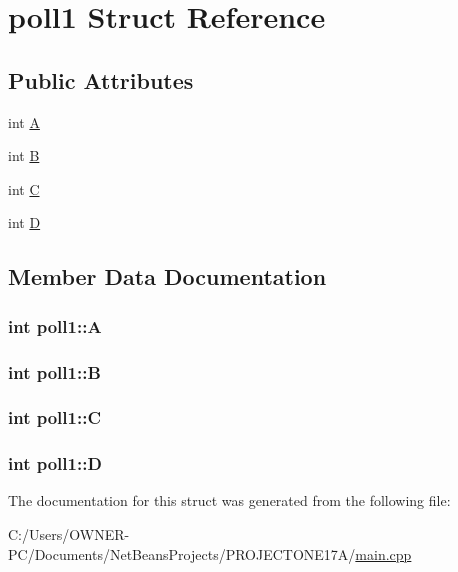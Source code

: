 \hypertarget{structpoll1}{\section{poll1 Struct Reference}
\label{structpoll1}
}
\subsection*{Public Attributes}
\begin{DoxyCompactItemize}
\item 
int \hyperlink{structpoll1_aa4038b3b8831be84ec7977d89d7958d0}{A}
\item 
int \hyperlink{structpoll1_a67e96a6486339656804cd7580d1a1c17}{B}
\item 
int \hyperlink{structpoll1_a698ff5d2ee805279fa834ae8e21b6c28}{C}
\item 
int \hyperlink{structpoll1_adddf16b74325e602d80db6681b9ee80a}{D}
\end{DoxyCompactItemize}


\subsection{Member Data Documentation}
\hypertarget{structpoll1_aa4038b3b8831be84ec7977d89d7958d0}{
\subsubsection[{A}]{\setlength{\rightskip}{0pt plus 5cm}int poll1\+::\+A}}\label{structpoll1_aa4038b3b8831be84ec7977d89d7958d0}
\hypertarget{structpoll1_a67e96a6486339656804cd7580d1a1c17}{
\subsubsection[{B}]{\setlength{\rightskip}{0pt plus 5cm}int poll1\+::\+B}}\label{structpoll1_a67e96a6486339656804cd7580d1a1c17}
\hypertarget{structpoll1_a698ff5d2ee805279fa834ae8e21b6c28}{
\subsubsection[{C}]{\setlength{\rightskip}{0pt plus 5cm}int poll1\+::\+C}}\label{structpoll1_a698ff5d2ee805279fa834ae8e21b6c28}
\hypertarget{structpoll1_adddf16b74325e602d80db6681b9ee80a}{
\subsubsection[{D}]{\setlength{\rightskip}{0pt plus 5cm}int poll1\+::\+D}}\label{structpoll1_adddf16b74325e602d80db6681b9ee80a}


The documentation for this struct was generated from the following file\+:\begin{DoxyCompactItemize}
\item 
C\+:/\+Users/\+O\+W\+N\+E\+R-\/\+P\+C/\+Documents/\+Net\+Beans\+Projects/\+P\+R\+O\+J\+E\+C\+T\+O\+N\+E17\+A/\hyperlink{main_8cpp}{main.\+cpp}\end{DoxyCompactItemize}
